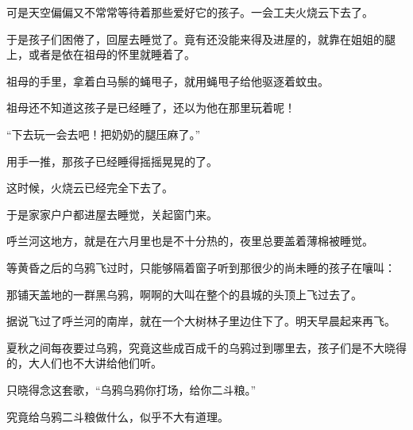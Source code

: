 \par 可是天空偏偏又不常常等待着那些爱好它的孩子。一会工夫火烧云下去了。
\par 于是孩子们困倦了，回屋去睡觉了。竟有还没能来得及进屋的，就靠在姐姐的腿上，或者是依在祖母的怀里就睡着了。
\par 祖母的手里，拿着白马鬃的蝇甩子，就用蝇甩子给他驱逐着蚊虫。
\par 祖母还不知道这孩子是已经睡了，还以为他在那里玩着呢！
\par “下去玩一会去吧！把奶奶的腿压麻了。”
\par 用手一推，那孩子已经睡得摇摇晃晃的了。
\par 这时候，火烧云已经完全下去了。
\par 于是家家户户都进屋去睡觉，关起窗门来。
\par 呼兰河这地方，就是在六月里也是不十分热的，夜里总要盖着薄棉被睡觉。
\par 等黄昏之后的乌鸦飞过时，只能够隔着窗子听到那很少的尚未睡的孩子在嚷叫：
\par 那铺天盖地的一群黑乌鸦，啊啊的大叫在整个的县城的头顶上飞过去了。
\par 据说飞过了呼兰河的南岸，就在一个大树林子里边住下了。明天早晨起来再飞。
\par 夏秋之间每夜要过乌鸦，究竟这些成百成千的乌鸦过到哪里去，孩子们是不大晓得的，大人们也不大讲给他们听。
\par 只晓得念这套歌，“乌鸦乌鸦你打场，给你二斗粮。”
\par 究竟给乌鸦二斗粮做什么，似乎不大有道理。
